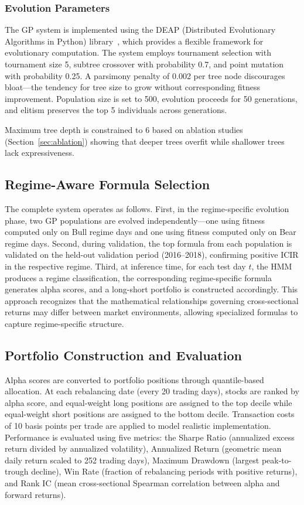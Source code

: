 \documentclass{ieeeaccess}
\begin{document}
\subsubsection{Evolution Parameters}
The GP system is implemented using the DEAP (Distributed Evolutionary Algorithms in Python) library~\cite{b34}, which provides a flexible framework for evolutionary computation. The system employs tournament selection with tournament size 5, subtree crossover with probability 0.7, and point mutation with probability 0.25. A parsimony penalty of 0.002 per tree node discourages bloat---the tendency for tree size to grow without corresponding fitness improvement. Population size is set to 500, evolution proceeds for 50 generations, and elitism preserves the top 5 individuals across generations.

Maximum tree depth is constrained to 6 based on ablation studies (Section~\ref{sec:ablation}) showing that deeper trees overfit while shallower trees lack expressiveness.

\subsection{Regime-Aware Formula Selection}
The complete system operates as follows. First, in the regime-specific evolution phase, two GP populations are evolved independently---one using fitness computed only on Bull regime days and one using fitness computed only on Bear regime days. Second, during validation, the top formula from each population is validated on the held-out validation period (2016--2018), confirming positive ICIR in the respective regime. Third, at inference time, for each test day $t$, the HMM produces a regime classification, the corresponding regime-specific formula generates alpha scores, and a long-short portfolio is constructed accordingly. This approach recognizes that the mathematical relationships governing cross-sectional returns may differ between market environments, allowing specialized formulas to capture regime-specific structure.

\subsection{Portfolio Construction and Evaluation}
Alpha scores are converted to portfolio positions through quantile-based allocation. At each rebalancing date (every 20 trading days), stocks are ranked by alpha score, and equal-weight long positions are assigned to the top decile while equal-weight short positions are assigned to the bottom decile. Transaction costs of 10 basis points per trade are applied to model realistic implementation. Performance is evaluated using five metrics: the Sharpe Ratio (annualized excess return divided by annualized volatility), Annualized Return (geometric mean daily return scaled to 252 trading days), Maximum Drawdown (largest peak-to-trough decline), Win Rate (fraction of rebalancing periods with positive returns), and Rank IC (mean cross-sectional Spearman correlation between alpha and forward returns).
\end{document}
